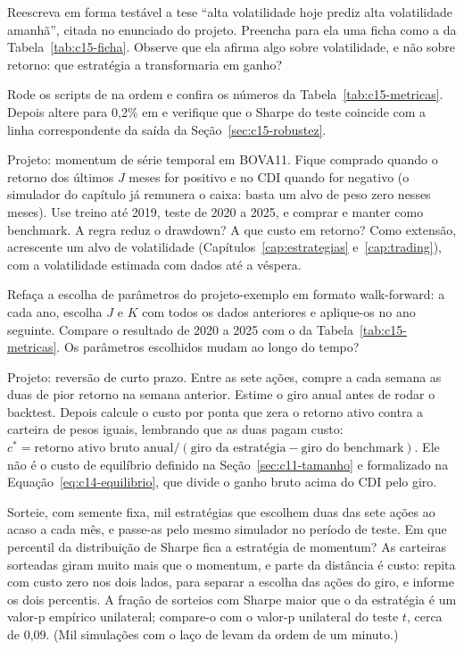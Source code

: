 \begin{exercicios}
  \item {} Reescreva em forma testável a tese ``alta volatilidade hoje prediz alta volatilidade amanhã'', citada no enunciado do projeto. Preencha para ela uma ficha como a da Tabela~\ref{tab:c15-ficha}. Observe que ela afirma algo sobre volatilidade, e não sobre retorno: que estratégia a transformaria em ganho?
  \item {} Rode os scripts de  na ordem e confira os números da Tabela~\ref{tab:c15-metricas}. Depois altere  para 0,2\% em  e verifique que o Sharpe do teste coincide com a linha correspondente da saída da Seção~\ref{sec:c15-robustez}.
  \item {} Projeto: momentum de série temporal em BOVA11. Fique comprado quando o retorno dos últimos $J$ meses for positivo e no CDI quando for negativo (o simulador do capítulo já remunera o caixa: basta um alvo de peso zero nesses meses). Use treino até 2019, teste de 2020 a 2025, e comprar e manter como benchmark. A regra reduz o drawdown? A que custo em retorno? Como extensão, acrescente um alvo de volatilidade (Capítulos~\ref{cap:estrategias} e~\ref{cap:trading}), com a volatilidade estimada com dados até a véspera.
  \item {} Refaça a escolha de parâmetros do projeto-exemplo em formato walk-forward: a cada ano, escolha $J$ e $K$ com todos os dados anteriores e aplique-os no ano seguinte. Compare o resultado de 2020 a 2025 com o da Tabela~\ref{tab:c15-metricas}. Os parâmetros escolhidos mudam ao longo do tempo?
  \item {} Projeto: reversão de curto prazo. Entre as sete ações, compre a cada semana as duas de pior retorno na semana anterior. Estime o giro anual antes de rodar o backtest. Depois calcule o custo por ponta que zera o retorno ativo contra a carteira de pesos iguais, lembrando que as duas pagam custo: $c^{*} = \text{retorno ativo bruto anual} / (\text{giro da estratégia} - \text{giro do benchmark})$. Ele não é o custo de equilíbrio definido na Seção~\ref{sec:c11-tamanho} e formalizado na Equação~\eqref{eq:c14-equilibrio}, que divide o ganho bruto acima do CDI pelo giro.
  \item {} Sorteie, com semente fixa, mil estratégias que escolhem duas das sete ações ao acaso a cada mês, e passe-as pelo mesmo simulador no período de teste. Em que percentil da distribuição de Sharpe fica a estratégia de momentum? As carteiras sorteadas giram muito mais que o momentum, e parte da distância é custo: repita com custo zero nos dois lados, para separar a escolha das ações do giro, e informe os dois percentis. A fração de sorteios com Sharpe maior que o da estratégia é um valor-p empírico unilateral; compare-o com o valor-p unilateral do teste $t$, cerca de 0,09. (Mil simulações com o laço de  levam da ordem de um minuto.)

\end{exercicios}

